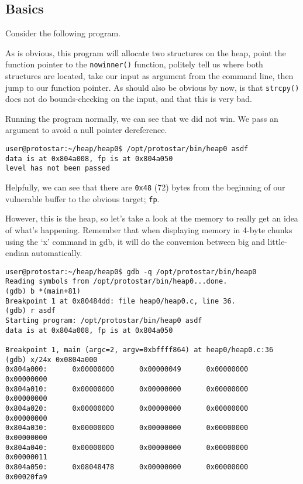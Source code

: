 \subsection{Basics}
Consider the following program.



As is obvious, this program will allocate two structures on the heap,
point the function pointer to the \texttt{nowinner()} function,
politely tell us where both structures are located, take our
input as argument from the command line, then jump to our function pointer.
As should also be obvious by now, is that \texttt{strcpy()} does
not do bounds-checking on the input, and that this is very bad.

Running the program normally, we can see that we did not win.
We pass an argument to avoid a null pointer dereference.
\begin{lstlisting}
user@protostar:~/heap/heap0$ /opt/protostar/bin/heap0 asdf
data is at 0x804a008, fp is at 0x804a050
level has not been passed
\end{lstlisting}
Helpfully, we can see that there are \texttt{0x48} (72) bytes
from the beginning of our vulnerable buffer to the obvious target; \texttt{fp}.

However, this is the heap, so let's take a look at the memory to really get
an idea of what's happening. Remember that when displaying memory in 4-byte
chunks using the `x' command in gdb, it will do the conversion between
big and little-endian automatically.

\begin{lstlisting}
user@protostar:~/heap/heap0$ gdb -q /opt/protostar/bin/heap0
Reading symbols from /opt/protostar/bin/heap0...done.
(gdb) b *(main+81)
Breakpoint 1 at 0x80484dd: file heap0/heap0.c, line 36.
(gdb) r asdf
Starting program: /opt/protostar/bin/heap0 asdf
data is at 0x804a008, fp is at 0x804a050

Breakpoint 1, main (argc=2, argv=0xbffff864) at heap0/heap0.c:36
(gdb) x/24x 0x0804a000
0x804a000:      0x00000000      0x00000049      0x00000000      0x00000000
0x804a010:      0x00000000      0x00000000      0x00000000      0x00000000
0x804a020:      0x00000000      0x00000000      0x00000000      0x00000000
0x804a030:      0x00000000      0x00000000      0x00000000      0x00000000
0x804a040:      0x00000000      0x00000000      0x00000000      0x00000011
0x804a050:      0x08048478      0x00000000      0x00000000      0x00020fa9
\end{lstlisting}

